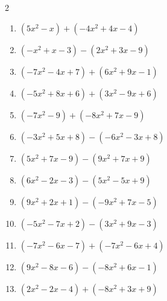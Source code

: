 \begin{multicols}{2}
\begin{enumerate}

  \item $(5x^{2}-x)+(-4x^{2}+4x-4)$


  \item $(-x^{2}+x-3)-(2x^{2}+3x-9)$


  \item $(-7x^{2}-4x+7)+(6x^{2}+9x-1)$


\columnbreak %

\resetques

  \item $(-5x^{2}+8x+6)+(3x^{2}-9x+6)$


  \item $(-7x^{2}-9)+(-8x^{2}+7x-9)$


  \item $(-3x^{2}+5x+8)-(-6x^{2}-3x+8)$


  \item $(5x^{2}+7x-9)-(9x^{2}+7x+9)$


  \item $(6x^{2}-2x-3)-(5x^{2}-5x+9)$


  \item $(9x^{2}+2x+1)-(-9x^{2}+7x-5)$


  \item $(-5x^{2}-7x+2)-(3x^{2}+9x-3)$


  \item $(-7x^{2}-6x-7)+(-7x^{2}-6x+4)$


  \item $(9x^{2}-8x-6)-(-8x^{2}+6x-1)$


  \item $(2x^{2}-2x-4)+(-8x^{2}+3x+9)$


\end{enumerate}
\end{multicols}
